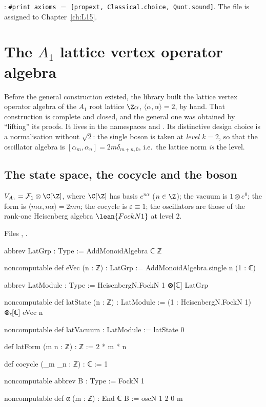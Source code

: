 \begin{status}
: \texttt{\#print axioms} $=$ \texttt{[propext, Classical.choice, Quot.sound]}. The file is
assigned to Chapter~\ref{ch:L15}.
\end{status}

\section{The \texorpdfstring{$A_1$}{A1} lattice vertex operator algebra}\label{l05:sec:A1}

Before the general construction existed, the library built the lattice vertex operator algebra of the $A_1$ root
lattice $\Z\alpha$, $\langle\alpha,\alpha\rangle=2$, by hand. That construction is complete and closed, and
the general one was obtained by ``lifting'' its proofs. It lives in the namespaces  and
. Its distinctive design choice is a normalisation without $\sqrt2$: the single boson is taken
at \emph{level $k=2$}, so that the oscillator algebra is $[\alpha_m,\alpha_n]=2m\delta_{m+n,0}$, i.e.\ the
lattice norm \emph{is} the level.

\subsection{The state space, the cocycle and the boson}

\begin{definition}\label{l05:def:A1space}
$V_{A_1}=\lfiveF_1\otimes\C[\Z]$, where $\C[\Z]$ has basis $e^{n\alpha}$ ($n\in\Z$); the vacuum is $1\otimes e^0$;
the form is $\langle m\alpha,n\alpha\rangle=2mn$; the cocycle is $\varepsilon\equiv1$; the oscillators are those of
the rank-one Heisenberg algebra $\lean{FockN 1}$ at level $2$.
\end{definition}

\noindent Files , .
\begin{leancode}
abbrev LatGrp : Type := AddMonoidAlgebra ℂ ℤ

noncomputable def eVec (n : ℤ) : LatGrp := AddMonoidAlgebra.single n (1 : ℂ)

abbrev LatModule : Type := HeisenbergN.FockN 1 ⊗[ℂ] LatGrp

noncomputable def latState (n : ℤ) : LatModule :=
  (1 : HeisenbergN.FockN 1) ⊗ₜ[ℂ] eVec n

noncomputable def latVacuum : LatModule := latState 0

def latForm (m n : ℤ) : ℤ := 2 * m * n

def cocycle (_m _n : ℤ) : ℂ := 1

noncomputable abbrev B : Type := FockN 1

noncomputable def α (m : ℤ) : End ℂ B := oscN 1 2 0 m
\end{leancode}

